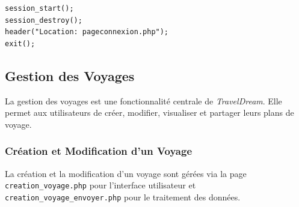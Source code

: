 \documentclass[a4paper,12pt]{article}
\begin{document}
\begin{lstlisting}
session_start();
session_destroy();
header("Location: pageconnexion.php");
exit();
\end{lstlisting}

\subsection{Gestion des Voyages}
La gestion des voyages est une fonctionnalité centrale de \textit{TravelDream}. Elle permet aux utilisateurs de créer, modifier, visualiser et partager leurs plans de voyage.

\subsubsection{Création et Modification d'un Voyage}
La création et la modification d'un voyage sont gérées via la page \texttt{creation\_voyage.php} pour l'interface utilisateur et \texttt{creation\_voyage\_envoyer.php} pour le traitement des données.
\end{document}
